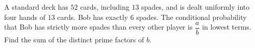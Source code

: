 A standard deck has $52$ cards, including $13$ spades, and is dealt uniformly into four hands of $13$ cards. Bob has exactly $6$ spades. The conditional probability that Bob has strictly more spades than every other player is $\dfrac{a}{b}$ in lowest terms. Find the sum of the distinct prime factors of $b$.
